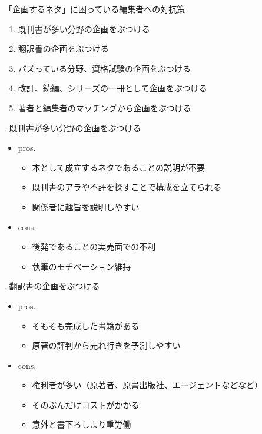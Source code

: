 \documentclass[14pt,dvipdfmx,uplatex]{beamer}
\begin{document}
\begin{frame}[t]{\leavevmode\inhibitglue 「企画するネタ」に困っている編集者への対抗策}
  \sffamily
  \begin{enumerate}
      \item 既刊書が多い分野の企画をぶつける
      \item 翻訳書の企画をぶつける
      \item バズっている分野、資格試験の企画をぶつける
      \item 改訂、続編、シリーズの一冊として企画をぶつける
      \item 著者と編集者のマッチングから企画をぶつける
  \end{enumerate}
\end{frame}

\begin{frame}[t]{. 既刊書が多い分野の企画をぶつける}
  \sffamily
  \begin{itemize}
      \item pros.
      \begin{itemize}
        \item 本として成立するネタであることの説明が不要
        \item 既刊書のアラや不評を探すことで構成を立てられる
        \item 関係者に趣旨を説明しやすい
      \end{itemize}
      \item cons.
      \begin{itemize}
        \item 後発であることの実売面での不利
        \item 執筆のモチベーション維持
      \end{itemize}
  \end{itemize}
\end{frame}

\begin{frame}[t]{. 翻訳書の企画をぶつける}
  \sffamily
  \begin{itemize}
      \item pros.
      \begin{itemize}
        \item そもそも完成した書籍がある
        \item 原著の評判から売れ行きを予測しやすい
      \end{itemize}
      \item cons.
      \begin{itemize}
        \item 権利者が多い（原著者、原書出版社、エージェントなどなど）
        \item そのぶんだけコストがかかる
        \item 意外と書下ろしより重労働
      \end{itemize}
  \end{itemize}
\end{frame}
\end{document}
